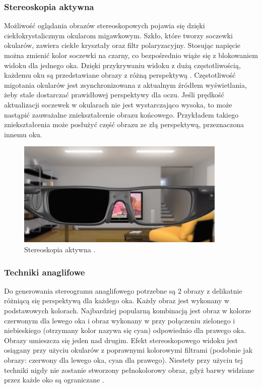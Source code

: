\subsubsection{Stereoskopia aktywna} 
Możliwość oglądania obrazów stereoskopowych pojawia się dzięki ciekłokrystalicznym okularom migawkowym. Szkło, które tworzy soczewki okularów, zawiera ciekłe kryształy oraz filtr polaryzacyjny. Stosując napięcie można zmienić kolor soczewki na czarny, co bezpośrednio wiąże się z blokowaniem widoku dla jednego oka. Dzięki przykrywaniu widoku z dużą częstotliwością, każdemu oku są przedstawiane obrazy z różną perspektywą \cite{active3d}. Częstotliwość migotania okularów jest zsynchronizowana z aktualnym źródłem wyświetlania, żeby stale dostarczać prawidłowej perspektywy dla oczu. Jeśli prędkość aktualizacji soczewek w okularach nie jest wystarczająco wysoka, to może nastąpić zauważalne zniekształcenie obrazu końcowego. Przykładem takiego zniekształcenia może posłużyć część obrazu ze złą perspektywą, przeznaczona innemu oku.
\begin{figure}[H]
		\centering
 		\includegraphics[width=10cm]{telewizor.png}
    	\caption{Stereoskopia aktywna \cite{active3d}.}
 		\label{rys2}
\end{figure} 

\subsubsection{Techniki anaglifowe}
Do generowania stereogramu anaglifowego potrzebne są 2 obrazy z delikatnie różniącą się perspektywą dla każdego oka. Każdy obraz jest wykonany w podstawowych kolorach. Najbardziej popularną kombinacją jest obraz w kolorze czerwonym dla lewego oka i obraz wykonany w przy połączeniu zielonego i niebieskiego (otrzymany kolor nazywa się cyan) odpowiednio dla prawego oka. Obrazy umieszcza się jeden nad drugim. Efekt stereoskopowego widoku jest osiągany przy użyciu okularów z poprawnymi kolorowymi filtrami (podobnie jak obrazy: czerwony dla lewego oka, cyan dla prawego). Niestety przy użyciu tej techniki nigdy nie zostanie stworzony pełnokolorowy obraz, gdyż barwy widziane przez każde oko są ograniczane \cite{anaglif}. 

